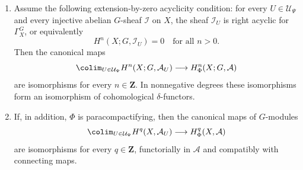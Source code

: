 \begin{lemma}
\begin{enumerate}
$$$$
\item Assume the following extension-by-zero acyclicity condition:
for every $U\in\mathcal U_\Psi$ and every injective abelian $G$-sheaf
$\mathcal I$ on $X$, the sheaf $\mathcal I_U$ is right acyclic for
$\Gamma_X^G$, or equivalently
\begin{equation}
\label{equation-equivariant-support-extension-zero-acyclic}
H^n(X;G,\mathcal I_U)=0
\quad\text{for all }n>0.
\end{equation}
Then the canonical maps
$$
\colim_{U\in\mathcal U_\Psi}H^n(X;G,\mathcal A_U)
\longrightarrow
H^n_\Phi(X;G,\mathcal A)
$$
are isomorphisms for every $n\in\mathbf Z$. In nonnegative degrees these
isomorphisms form an isomorphism of cohomological $\delta$-functors.
\item If, in addition, $\Phi$ is paracompactifying, then the canonical
maps of $G$-modules
$$
\colim_{U\in\mathcal U_\Psi}H^q(X,\mathcal A_U)
\longrightarrow
H^q_\Phi(X,\mathcal A)
$$
are isomorphisms for every $q\in\mathbf Z$, functorially in $\mathcal A$
and compatibly with connecting maps.
\end{enumerate}
\end{lemma}

